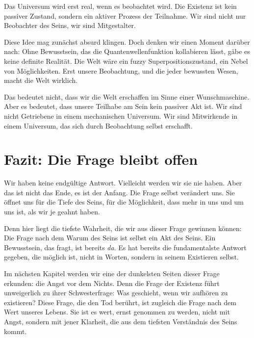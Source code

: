 \begin{defi}
	Das Universum wird erst real, wenn es beobachtet wird. Die Existenz ist kein passiver Zustand, sondern ein aktiver Prozess der Teilnahme. Wir sind nicht nur Beobachter des Seins, wir sind Mitgestalter.
\end{defi}

Diese Idee mag zunächst absurd klingen. Doch denken wir einen Moment darüber nach: Ohne Bewusstsein, das die Quantenwellenfunktion \glqq kollabieren\grqq{} lässt, gäbe es keine definite Realität. Die Welt wäre ein fuzzy Superpositionszustand, ein Nebel von Möglichkeiten. Erst unsere Beobachtung, und die jeder bewussten Wesen, macht die Welt \glqq wirklich\grqq{}.

Das bedeutet nicht, dass wir die Welt \glqq erschaffen\grqq{} im Sinne einer Wunschmaschine. Aber es bedeutet, dass unsere Teilhabe am Sein kein passiver Akt ist. Wir sind nicht Getriebene in einem mechanischen Universum. Wir sind Mitwirkende in einem Universum, das sich durch Beobachtung selbst erschafft.

\section{Fazit: Die Frage bleibt offen}

Wir haben keine endgültige Antwort. Vielleicht werden wir sie nie haben. Aber das ist nicht das Ende, es ist der Anfang. Die Frage selbst verändert uns. Sie öffnet uns für die Tiefe des Seins, für die Möglichkeit, dass mehr in uns und um uns ist, als wir je geahnt haben.

Denn hier liegt die tiefste Wahrheit, die wir aus dieser Frage gewinnen können: Die Frage nach dem \glqq Warum\grqq{} des Seins ist selbst ein Akt des Seins. Ein Bewusstsein, das fragt, ist bereits \emph{da}. Es hat bereits die fundamentalste Antwort gegeben, die möglich ist, nicht in Worten, sondern in seinem Existieren selbst.

Im nächsten Kapitel werden wir eine der dunkelsten Seiten dieser Frage erkunden: die Angst vor dem Nichts. Denn die Frage der Existenz führt unweigerlich zu ihrer Schwesterfrage: Was geschieht, wenn wir aufhören zu existieren? Diese Frage, die den Tod berührt, ist zugleich die Frage nach dem Wert unseres Lebens. Sie ist es wert, ernst genommen zu werden, nicht mit Angst, sondern mit jener Klarheit, die aus dem tiefsten Verständnis des Seins kommt.
